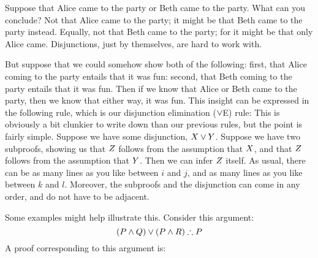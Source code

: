 Suppose that  Alice came to the party or Beth came to the party. What can you conclude? Not that Alice came to the party; it might be that Beth came to the party instead. Equally, not that Beth came to the party; for it might be that only Alice came. Disjunctions, just by themselves, are hard to work with.

But suppose that we could somehow show both of the following: first, that Alice coming to the party entails that it was fun: second, that Beth coming to the party entails that it was fun. Then if we know that Alice or Beth came to the party, then we know that either way, it was fun. This insight can be expressed in the following rule, which is our disjunction elimination ($\vee$E) rule:
This is obviously a bit clunkier to write down than our previous rules, but the point is fairly simple. Suppose we have some disjunction, $X \vee Y$. Suppose we have two
subproofs,
showing us that $Z$ follows from
the assumption that
$X$, and that $Z$ follows from
the assumption that
$Y$. Then we can infer $Z$ itself. As usual, there can be as many lines as you like between
$i$ and $j$, and as many lines as you like between $k$ and $l$.
Moreover,
the subproofs and the disjunction
can come in any order, and do not have to be adjacent.

Some examples might help illustrate this. Consider this argument:
$$(P \eand Q) \eor (P \eand R) \therefore P$$
A proof corresponding to this argument is:
	\begin{fitchproof}
			\open
			\close
			\open
			\close
	\end{fitchproof}



